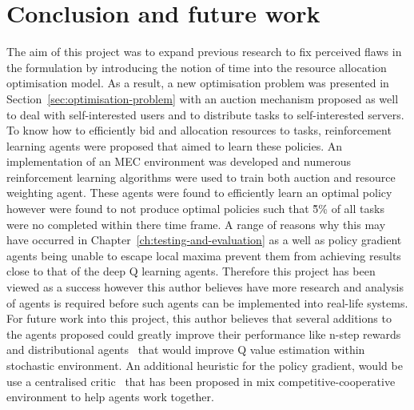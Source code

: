 \chapter{Conclusion and future work}\label{ch:conclusion-and-future-work}
The aim of this project was to expand previous research to fix perceived flaws in the formulation by introducing the
notion of time into the resource allocation optimisation model. As a result, a new optimisation problem was presented
in Section~\ref{sec:optimisation-problem} with an auction mechanism proposed as well to deal with self-interested
users and to distribute tasks to self-interested servers. To know how to efficiently bid and allocation resources to
tasks, reinforcement learning agents were proposed that aimed to learn these policies. An implementation of an MEC
environment was developed and numerous reinforcement learning algorithms were used to train both auction and resource
weighting agent. These agents were found to efficiently learn an optimal policy however were found to not produce
optimal policies such that \~5\% of all tasks were no completed within there time frame. A range of reasons why this
may have occurred in Chapter~\ref{ch:testing-and-evaluation} as a well as policy gradient agents being unable to
escape local maxima prevent them from achieving results close to that of the deep Q learning agents. Therefore this
project has been viewed as a success however this author believes have more research and analysis of agents is required
before such agents can be implemented into real-life systems. \\
For future work into this project, this author believes that several additions to the agents proposed could greatly
improve their performance like n-step rewards~\citep{multi-step-dqn} and distributional agents~\citep{distributional_dqn}
that would improve Q value estimation within stochastic environment. An additional heuristic for the policy gradient,
would be use a centralised critic~\citep{maddpg} that has been proposed in mix competitive-cooperative environment to
help agents work together.

